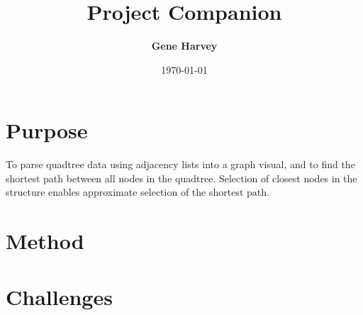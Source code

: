 \documentclass[10pt, letterpaper]{geneassignment}
\title{Project Companion}
\author{\textbf{Gene Harvey}}
\date{\today}
\begin{document}
	\maketitle
	
	\section{Purpose}
		To parse quadtree data using adjacency lists into a graph visual, and to find the shortest path between all nodes in the quadtree. Selection of closest nodes in the structure enables approximate selection of the shortest path.	
	\section{Method}
		
	
	\section{Challenges}
	
	
\end{document}
